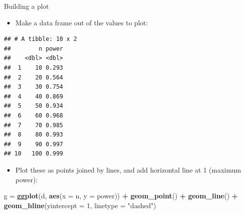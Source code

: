 \documentclass[ignorenonframetext,]{beamer}
\newenvironment{Shaded}{\begin{snugshade}}{\end{snugshade}}
\newcommand{\DataTypeTok}[1]{\textcolor[rgb]{0.13,0.29,0.53}{#1}}
\newcommand{\DecValTok}[1]{\textcolor[rgb]{0.00,0.00,0.81}{#1}}
\newcommand{\KeywordTok}[1]{\textcolor[rgb]{0.13,0.29,0.53}{\textbf{#1}}}
\newcommand{\NormalTok}[1]{#1}
\newcommand{\OperatorTok}[1]{\textcolor[rgb]{0.81,0.36,0.00}{\textbf{#1}}}
\newcommand{\StringTok}[1]{\textcolor[rgb]{0.31,0.60,0.02}{#1}}
\providecommand{\tightlist}{%
  \setlength{\itemsep}{0pt}\setlength{\parskip}{0pt}}
\begin{document}
\begin{frame}[fragile]{Building a plot}
\protect\hypertarget{building-a-plot}{}

\begin{itemize}
\tightlist
\item
  Make a data frame out of the values to plot:
\end{itemize}

\begin{Shaded}
\end{Shaded}

\begin{verbatim}
## # A tibble: 10 x 2
##        n power
##    <dbl> <dbl>
##  1    10 0.293
##  2    20 0.564
##  3    30 0.754
##  4    40 0.869
##  5    50 0.934
##  6    60 0.968
##  7    70 0.985
##  8    80 0.993
##  9    90 0.997
## 10   100 0.999
\end{verbatim}

\begin{itemize}
\tightlist
\item
  Plot these as points joined by lines, and add horizontal line at 1
  (maximum power):
\end{itemize}

\begin{Shaded}
\begin{Highlighting}[]
\NormalTok{g =}\StringTok{ }\KeywordTok{ggplot}\NormalTok{(d, }\KeywordTok{aes}\NormalTok{(}\DataTypeTok{x =}\NormalTok{ n, }\DataTypeTok{y =}\NormalTok{ power)) }\OperatorTok{+}\StringTok{ }\KeywordTok{geom_point}\NormalTok{() }\OperatorTok{+}\StringTok{ }
\StringTok{  }\KeywordTok{geom_line}\NormalTok{() }\OperatorTok{+}\StringTok{ }
\StringTok{  }\KeywordTok{geom_hline}\NormalTok{(}\DataTypeTok{yintercept =} \DecValTok{1}\NormalTok{, }\DataTypeTok{linetype =} \StringTok{"dashed"}\NormalTok{)}
\end{Highlighting}
\end{Shaded}

\end{frame}
\end{document}
